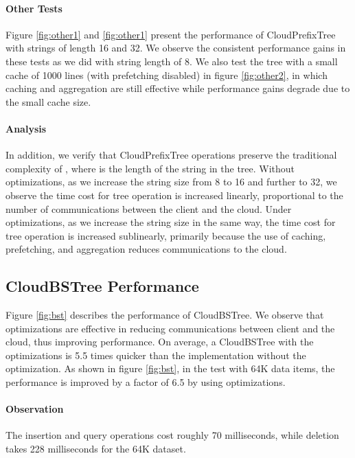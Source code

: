 \documentclass[10pt, conference, compsocconf]{IEEEtran}
\begin{document}
 \paragraph{Other Tests}Figure \ref{fig:other1} and \ref{fig:other1} present the performance
 of CloudPrefixTree with strings of length 16 and 32.  We observe the consistent performance gains in these tests as we did with string length of 8.
 We also test the tree with a small cache of 1000 lines (with
 prefetching disabled) in figure \ref{fig:other2}, in which caching and aggregation are still effective while performance gains
 degrade due to the small cache size.
 
 \paragraph{Analysis} In addition, we verify that CloudPrefixTree operations preserve the traditional complexity of , 
 where  is the length of the string in the tree.
 Without optimizations, as we increase the string size from 8 to 16 and further to 32, we observe the time cost for 
 tree operation is increased linearly, proportional to the number of communications between the client and the cloud. 
 Under optimizations, as we increase the string size in the same way, the time cost for 
 tree operation is increased sublinearly, primarily because the use of caching, prefetching, and aggregation reduces communications to the cloud.
 






\subsection{CloudBSTree Performance}
Figure \ref{fig:bst} describes the performance of CloudBSTree.
We observe that optimizations are effective in
reducing communications between client and the cloud, thus improving performance.
On average, a CloudBSTree with the optimizations is 5.5 times quicker than the 
implementation without the optimization.
As shown in figure \ref{fig:bst}, in the test with 64K data items, 
the performance is improved by a factor of 6.5 by using optimizations.

\paragraph{Observation}The insertion and 
query operations cost roughly 70 milliseconds, 
while deletion takes 228 milliseconds for the 64K dataset.
\end{document}

